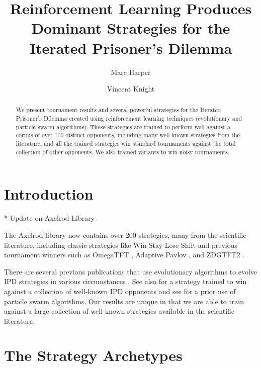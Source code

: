 \documentclass{article}
\title{Reinforcement Learning Produces Dominant Strategies for the
Iterated Prisoner's Dilemma}
\author{Marc Harper \and Vincent Knight} %
\date{}
\begin{document}
\maketitle


\begin{abstract}
    We present tournament results and several powerful strategies for the Iterated
    Prisoner's Dilemma created using reinforcement learning techniques
    (evolutionary and particle swarm algorithms). These strategies are
    trained to perform well against a corpus of over 100 distinct
    opponents, including many well-known strategies from the literature, and all
    the trained strategies win standard tournaments against the total collection
    of other opponents. We also trained variants to win noisy tournaments.
\end{abstract} 

\section{Introduction}\label{sec:introduction}

* Update on Axelrod Library


The Axelrod library \cite{knight2016open} now contains over 200 strategies,
many from the scientific literature, including classic strategies like Win Stay
Lose Shift \cite{nowak1993strategy} and previous tournament winners such as
OmegaTFT \cite{slany2007some}, Adaptive Pavlov \cite{li2007design}, and
ZDGTFT2 \cite{stewart2012extortion}.


There are several previous publications that use evolutionary algorithms to
evolve IPD strategies in various circumstances \cite{marks1989niche} \cite{fogel1993evolving} \cite{ashlock2006training}
\cite{ashlock2006changes} \cite{vassiliades2010multiagent} \cite{ashlock2014shaped}
\cite{ashlock2014evolution} \cite{ashlock2015multiple} \cite{barlow2015varying}
\cite{sudo2015effects}. See also \cite{gaudesi2016exploiting} for a strategy
trained to win against a collection of well-known IPD opponents and see
\cite{franken2005particle} for a prior use of particle swarm algorithms. Our
results are unique in that we are able to train against a large collection of
well-known strategies available in the scientific literature.

\section{The Strategy Archetypes}
\end{document}
